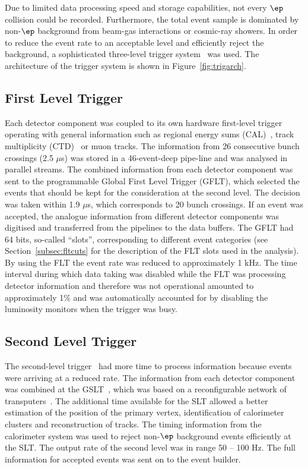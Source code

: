 Due to limited data processing speed and storage capabilities, not every $\ep$ collision could be recorded. Furthermore, the total event sample is dominated by non-$\ep$ background from beam-gas interactions or cosmic-ray showers. In order to reduce the event rate to an acceptable level and efficiently reject the background, a sophisticated three-level trigger system~\cite{Smith:1992im,nim:a379:542,Carlin:1995rv} was used. The architecture of the \zeus trigger system is shown in Figure~\ref{fig:trigarch}. 

\subsection{First Level Trigger}
\label{subsec:flt} Each detector component was coupled to its own hardware first-level trigger operating with general information such as regional energy sums (CAL)~\cite{nim:a355:278}, track multiplicity (CTD)~\cite{nim:a315:431} or muon tracks. The information from 26 consecutive bunch crossings (2.5 $\mu$s) was stored in a 46-event-deep pipe-line and was analysed in parallel streams. The combined information from each detector component was sent to the programmable Global First Level Trigger (GFLT), which selected the events that should be kept for the consideration at the second level. The decision was taken within 1.9 $\mu$s, which corresponds to 20 bunch crossings. If an event was accepted, the analogue information from different detector components was digitised and transferred from the pipelines to the data buffers. The GFLT had 64 bits, so-called ``slots'', corresponding to different event categories (see Section~\ref{subsec:fltcuts} for the description of the FLT slots used in the analysis). By using the FLT the event rate was reduced to approximately 1 kHz. The time interval during which data taking was disabled while the FLT was processing detector information and therefore was not operational amounted to approximately 1\% and was automatically accounted for by disabling the luminosity monitors when the trigger was busy.

\subsection{Second Level Trigger}
\label{subsec:slt}
The second-level trigger~\cite{Allfrey:2007zz} had more time to process information because events were arriving at a reduced rate. The information from each detector component was combined at the GSLT~\cite{upub:abbiendi:zn99063,upub:chlebana:zn94102,Uijterwaal:1992xc}, which was based on a reconfigurable network of transputers~\cite{npps:b32:181}. The additional time available for the SLT allowed a better estimation of the position of the primary vertex, identification of  calorimeter clusters and reconstruction of tracks. The timing information from the calorimeter system was used to reject non-$\ep$ background events efficiently at the SLT. The output rate of the second level was in range 50 -- 100 Hz. The full information for accepted events was sent on to the event builder.

